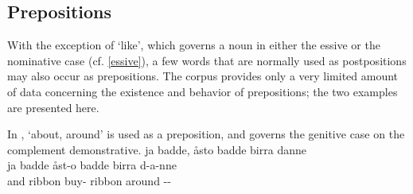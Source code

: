 \subsection{Prepositions}\label{prepositions}
With the exception of  ‘like’, which governs a noun in either the essive or the nominative case (cf. \SEC\ref{essive}), 
a few words that are normally used as postpositions may also occur as prepositions. 
The corpus provides only a very limited amount of data concerning the existence and behavior of prepositions; the two examples are presented here. 

In ,  ‘about, around’ is used as a preposition, and governs the genitive case on the complement demonstrative. 
\ea\label{prepositionEx1}%
\glll	ja badde, åsto badde birra danne\\
	ja badde åst-o badde birra d-a-nne\\
	and ribbon\BS{} buy-\BS{} ribbon\BS{} around --\\\nopagebreak
{}	
\z


